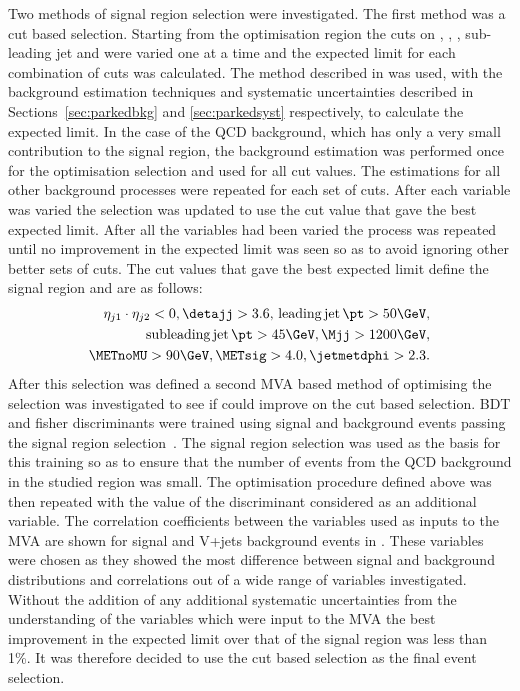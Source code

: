Two methods of signal region selection were investigated. The first method was a cut based selection. Starting from the optimisation region the cuts on \METsig, \jetmetdphi, \detajj, sub-leading jet \pt and \Mjj were varied one at a time and the expected limit for each combination of cuts was calculated. The method described in  was used, with the background estimation techniques and systematic uncertainties described in Sections~\ref{sec:parkedbkg} and \ref{sec:parkedsyst} respectively, to calculate the expected limit. In the case of the \ac{QCD} background, which has only a very small contribution to the signal region, the background estimation was performed once for the optimisation selection and used for all cut values. The estimations for all other background processes were repeated for each set of cuts. After each variable was varied the selection was updated to use the cut value that gave the best expected limit. After all the variables had been varied the process was repeated until no improvement in the expected limit was seen so as to avoid ignoring other better sets of cuts. The cut values that gave the best expected limit define the signal region and are as follows:
\begin{equation}
  \label{eq:parkedsigsel}
  \begin{split}
    \eta_{j1}\cdot\eta_{j2}<0,\detajj>3.6,\,\mathrm{leading\,jet\,\pt}>50 \GeV,\\
    \mathrm{subleading\,jet\,\pt}>45 \GeV, \Mjj>1200 \GeV,\\
    \METnoMU>90 \GeV, \METsig>4.0,\jetmetdphi>2.3.
  \end{split}
\end{equation}
After this selection was defined a second \ac{MVA} based method of optimising the selection was investigated to see if could improve on the cut based selection. \ac{BDT} and fisher discriminants were trained using signal and background events passing the signal region selection~\cite{TMVA}. The signal region selection was used as the basis for this training so as to ensure that the number of events from the \ac{QCD} background in the studied region was small. The optimisation procedure defined above was then repeated with the value of the discriminant considered as an additional variable. The correlation coefficients between the variables used as inputs to the \ac{MVA} are shown for signal and V+jets background events in . These variables were chosen as they showed the most difference between signal and background distributions and correlations out of a wide range of variables investigated. Without the addition of any additional systematic uncertainties from the understanding of the variables which were input to the \ac{MVA} the best improvement in the expected limit over that of the signal region was less than 1\%. It was therefore decided to use the cut based selection as the final event selection.
